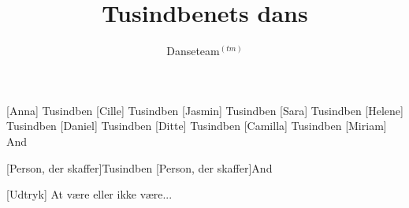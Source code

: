 \documentclass[a4paper,11pt]{article}
\title{Tusindbenets dans}
\author{Danseteam$^{(tm)}$}
\begin{document}
\maketitle

\begin{roles}
[Anna] Tusindben
[Cille] Tusindben
[Jasmin] Tusindben
[Sara] Tusindben
[Helene] Tusindben
[Daniel] Tusindben
[Ditte] Tusindben
[Camilla] Tusindben
[Miriam] And
\end{roles}

\begin{props}
[Person, der skaffer]Tusindben
[Person, der skaffer]And
\end{props}


\begin{sketch}


[Udtryk] At være eller ikke være... 



\end{sketch}
\end{document}
